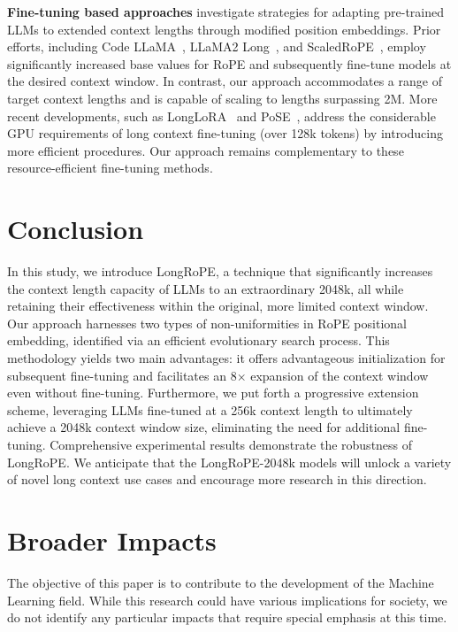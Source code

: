 \textbf{Fine-tuning based approaches} investigate strategies for adapting pre-trained LLMs to extended context lengths through modified position embeddings. Prior efforts, including Code LLaMA~\cite{codellama}, LLaMA2 Long~\cite{xiong2023effective}, and ScaledRoPE~\cite{liu2023scaling}, employ significantly increased base values for RoPE and subsequently fine-tune models at the desired context window. In contrast, our approach accommodates a range of target context lengths and is capable of scaling to lengths surpassing 2M. More recent developments, such as LongLoRA~\cite{longlora} and PoSE~\cite{zhu2023pose}, address the considerable GPU requirements of long context fine-tuning (over 128k tokens) by introducing more efficient procedures. Our approach remains complementary to these resource-efficient fine-tuning methods.

\section{Conclusion}

In this study, we introduce LongRoPE, a technique that significantly increases the context length capacity of LLMs to an extraordinary 2048k, all while retaining their effectiveness within the original, more limited context window. Our approach harnesses two types of non-uniformities in RoPE positional embedding, identified via an efficient evolutionary search process. This methodology yields two main advantages: it offers advantageous initialization for subsequent fine-tuning and facilitates an 8$\times$ expansion of the context window even without fine-tuning. Furthermore, we put forth a progressive extension scheme, leveraging LLMs fine-tuned at a 256k context length to ultimately achieve a 2048k context window size, eliminating the need for additional fine-tuning. Comprehensive experimental results demonstrate the robustness of LongRoPE. We anticipate that the LongRoPE-2048k models will unlock a variety of novel long context use cases and encourage more research in this direction.

\section*{Broader Impacts} The objective of this paper is to contribute to the development of the Machine Learning field. While this research could have various implications for society, we do not identify any particular impacts that require special emphasis at this time.

	\balance

